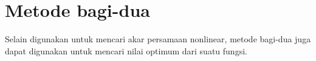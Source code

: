 \section{Metode bagi-dua}

Selain digunakan untuk mencari akar persamaan nonlinear, metode bagi-dua
juga dapat digunakan untuk mencari nilai optimum dari suatu fungsi.
